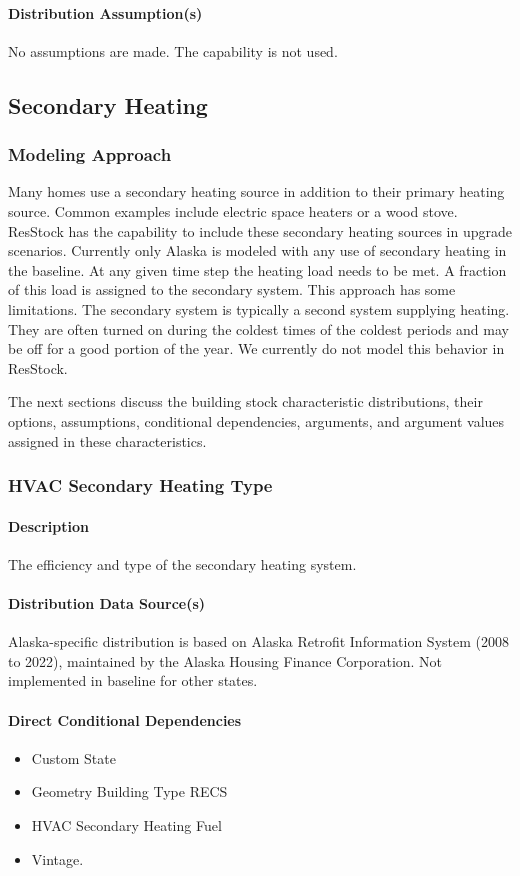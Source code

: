 \paragraph{Distribution Assumption(s)}
No assumptions are made. The capability is not used.


\subsection{Secondary Heating}
\subsubsection{Modeling Approach}
Many homes use a secondary heating source in addition to their primary heating source. Common examples include electric space heaters or a wood stove. ResStock has the capability to include these secondary heating sources in upgrade scenarios. Currently only Alaska is modeled with any use of secondary heating in the baseline. At any given time step the heating load needs to be met. A fraction of this load is assigned to the secondary system. This approach has some limitations. The secondary system is typically a second system supplying heating. They are often turned on during the coldest times of the coldest periods and may be off for a good portion of the year. We currently do not model this behavior in ResStock.

The next sections discuss the building stock characteristic distributions, their options, assumptions, conditional dependencies, arguments, and argument values assigned in these characteristics.

\subsubsection{HVAC Secondary Heating Type}
\paragraph{Description}
The efficiency and type of the secondary heating system.
\paragraph{Distribution Data Source(s)}
Alaska-specific distribution is based on Alaska Retrofit Information System (2008 to 2022), maintained by the Alaska Housing Finance Corporation. Not implemented in baseline for other states.
\paragraph{Direct Conditional Dependencies}
\begin{itemize}
    \item Custom State
    \item Geometry Building Type RECS
    \item HVAC Secondary Heating Fuel
    \item Vintage.
\end{itemize}
